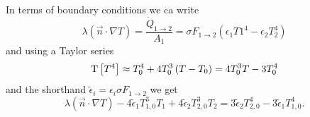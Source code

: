 In terms of boundary conditions we ca write
\begin{equation}
	\lambda \left(\vec{n} \cdot \nabla T \right) = \frac{\dot{Q}_{1 \rightarrow 2}}{A_1} = \sigma F_{1 \rightarrow 2} \left(\epsilon_1 T1^4 - \epsilon_2 T_2^4\right)
\end{equation}
and using a Taylor series
\begin{equation}
	\mathrm{T}\left[ T^4 \right] \approx T_0^4 + 4 T_0^3 \left(T - T_0 \right) =  4 T_0^3 T - 3 T_0^4
\end{equation}
and the shorthand $\tilde{\epsilon}_i = \epsilon_i \sigma F_{1 \rightarrow 2}$ we get
\begin{equation}
	\lambda \left(\vec{n} \cdot \nabla T \right)  - 4 \tilde{\epsilon}_1 T_{1, 0}^3 T_1 + 4 \tilde{\epsilon}_2 T_{2, 0}^3 T_2   = 3 \tilde{\epsilon}_2 T_{2, 0}^4 - 3 \tilde{\epsilon}_1 T_{1, 0}^4.
\end{equation}